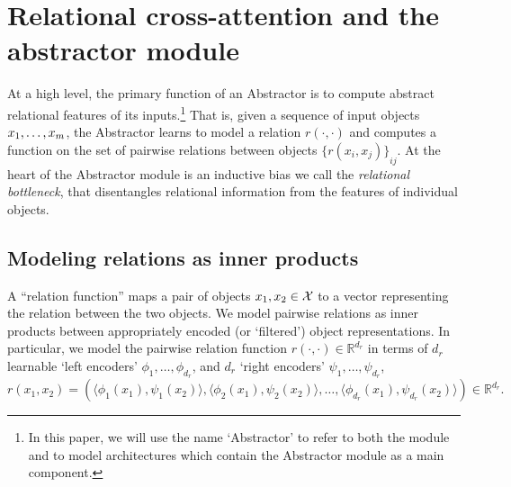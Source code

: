 \section{Relational cross-attention and the abstractor module}\label{sec:abstractor_module}

At a high level, the primary function of an Abstractor is to compute abstract relational features of its inputs.\footnote{In this paper, we will use the name `Abstractor' to refer to both the module and to model architectures which contain the Abstractor module as a main component.} That is, given a sequence of input objects $x_1, \ldots, x_m$, the Abstractor learns to model a relation $r(\cdot, \cdot)$ and computes a function on the set of pairwise relations between objects ${\{ r(x_i, x_j) \}}_{ij}$. At the heart of the Abstractor module is an inductive bias we call the \textit{relational bottleneck}, that disentangles relational information from the features of individual objects.

\subsection{Modeling relations as inner products}\label{ssec:relations_as_inner_prods}

A ``relation function'' maps a pair of objects $x_1, x_2 \in {\mathcal{X}}$ to a vector representing the relation between the two objects. We model pairwise relations as inner products between appropriately encoded (or `filtered') object representations. In particular, we model the pairwise relation function $r(\cdot, \cdot) \in \mathbb{R}^{d_r}$ in terms of $d_r$ learnable `left encoders' $\phi_1, \ldots, \phi_{d_r}$, and $d_r$ `right encoders' $\psi_1, \ldots, \psi_{d_r}$,
\begin{equation}\label{eq:inner_prod_rel}
    r(x_1,x_2) = \left(\langle \phi_1(x_1), \psi_1(x_2) \rangle, \langle \phi_2(x_1), \psi_2(x_2) \rangle, \ldots, \langle \phi_{d_r}(x_1), \psi_{d_r}(x_2) \rangle \right) \in \mathbb{R}^{d_r}.
\end{equation}


